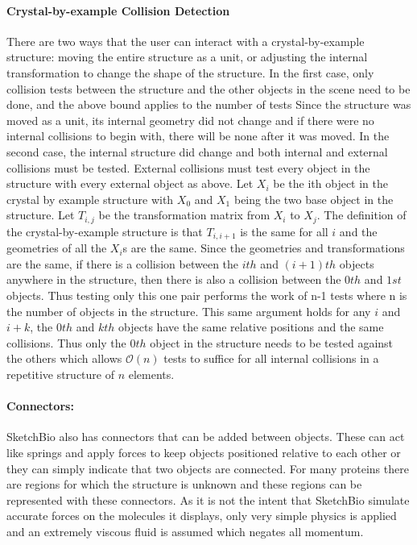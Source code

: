 \documentclass[twocolumn]{bmcart}%
\begin{document}
\paragraph*{Crystal-by-example Collision Detection}
There are two ways that the user can interact with a crystal-by-example structure: moving the entire structure as a unit, or adjusting the internal transformation to change the shape of the structure.  In the first case, only collision tests between the structure and the other objects in the scene need to be done, and the above bound applies to the number of tests  Since the structure was moved as a unit, its internal geometry did not change and if there were no internal collisions to begin with, there will be none after it was moved.  In the second case, the internal structure did change and both internal and external collisions must be tested.  External collisions must test every object in the structure with every external object as above.  Let $X_i$ be the ith object in the crystal by example structure with $X_0$ and $X_1$ being the two base object in the structure.  Let $T_{i,j}$ be the transformation matrix from $X_i$ to $X_j$.  The definition of the crystal-by-example structure is that $T_{i,i+1}$ is the same for all $i$ and the geometries of all the $X_i$s are the same.  Since the geometries and transformations are the same, if there is a collision between the $ith$ and $(i+1)th$ objects anywhere in the structure, then there is also a collision between the $0th$ and $1st$ objects.  Thus testing only this one pair performs the work of n-1 tests where n is the number of objects in the structure.  This same argument holds for any $i$ and $i+k$, the $0th$ and $kth$ objects have the same relative positions and the same collisions.  Thus only the $0th$ object in the structure needs to be tested against the others which allows $\mathcal{O}(n)$ tests to suffice for all internal collisions in a repetitive structure of $n$ elements.


\paragraph*{Connectors:}
SketchBio also has connectors that can be added between objects.  These can act like springs and apply forces to keep objects positioned relative to each other or they can simply indicate that two objects are connected.  For many proteins there are regions for which the structure is unknown and these regions can be represented with these connectors.  As it is not the intent that SketchBio simulate accurate forces on the molecules it displays, only very simple physics is applied and an extremely viscous fluid is assumed which negates all momentum.
\end{document}
